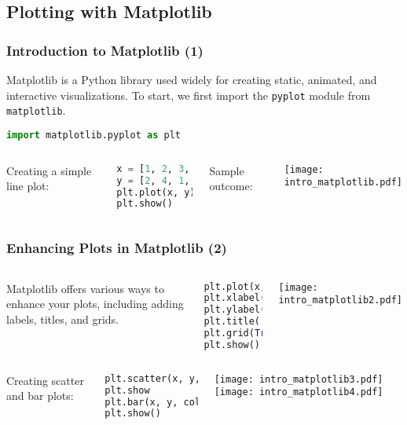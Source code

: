 \subsection{Plotting with Matplotlib}
\begin{frame}[fragile]
  \frametitle{Introduction to Matplotlib (1)}
  Matplotlib is a Python library used widely for creating static, animated, and interactive visualizations. To start, we first import the \lstinline{pyplot} module from \lstinline{matplotlib}.\pause
  
  \begin{lstlisting}[language=Python]
import matplotlib.pyplot as plt
  \end{lstlisting}\pause
  
  \begin{columns}[T]
    Creating a simple line plot:

    \begin{lstlisting}[language=Python,firstnumber=2]
x = [1, 2, 3, 4, 5]
y = [2, 4, 1, 3, 7]
plt.plot(x, y)
plt.show()
  \end{lstlisting}
  Sample outcome:
  
  \texttt{[image: intro\_matplotlib.pdf]}
\end{columns}
\end{frame}

\begin{frame}[fragile]
  \frametitle{Enhancing Plots in Matplotlib (2)}
  \begin{columns}
  Matplotlib offers various ways to enhance your plots, including adding labels, titles, and grids.\pause
  \begin{lstlisting}[language=Python]
plt.plot(x, y, 'r-o')
plt.xlabel('X-axis label')
plt.ylabel('Y-axis label')
plt.title('Plot Title')
plt.grid(True)
plt.show()
  \end{lstlisting}\pause
   \texttt{[image: intro\_matplotlib2.pdf]}
  \end{columns}

  \begin{columns}
  Creating scatter and bar plots:
  \begin{lstlisting}[language=Python]
plt.scatter(x, y, color='red')
plt.show
plt.bar(x, y, color='green')
plt.show()
  \end{lstlisting}
  \texttt{[image: intro\_matplotlib3.pdf]}
  \texttt{[image: intro\_matplotlib4.pdf]}
  \end{columns}
\end{frame}

